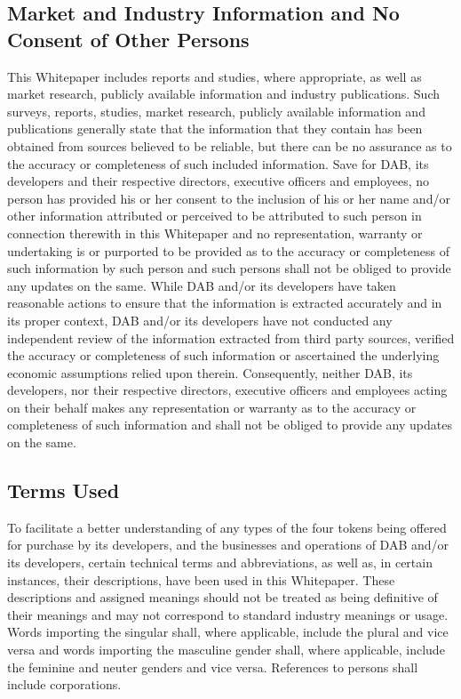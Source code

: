 \documentclass[review]{elsarticle}
\begin{document}
\subsection{Market and Industry Information and No Consent of Other Persons}
This Whitepaper includes reports and studies, where appropriate, as well as market research, publicly available information and industry publications. Such surveys, reports, studies, market research, publicly available information and publications generally state that the information that they contain has been obtained from sources believed to be reliable, but there can be no assurance as to the accuracy or completeness of such included information. 
Save for DAB, its developers and their respective directors, executive officers and employees, no person has provided his or her consent to the inclusion of his or her name and/or other information attributed or perceived to be attributed to such person in connection therewith in this Whitepaper and no representation, warranty or undertaking is or purported to be provided as to the accuracy or completeness of such information by such person and such persons shall not be obliged to provide any updates on the same. 
While DAB and/or its developers have taken reasonable actions to ensure that the information is extracted accurately and in its proper context, DAB and/or its developers have not conducted any independent review of the information extracted from third party sources, verified the accuracy or completeness of such information or ascertained the underlying economic assumptions relied upon therein. Consequently, neither DAB, its developers, nor their respective directors, executive officers and employees acting on their behalf makes any representation or warranty as to the accuracy or completeness of such information and shall not be obliged to provide any updates on the same. 

\subsection{Terms Used}
To facilitate a better understanding of any types of the four tokens being offered for purchase by its developers, and the businesses and operations of DAB and/or its developers, certain technical terms and abbreviations, as well as, in certain instances, their descriptions, have been used in this Whitepaper. These descriptions and assigned meanings should not be treated as being definitive of their meanings and may not correspond to standard industry meanings or usage. 
Words importing the singular shall, where applicable, include the plural and vice versa and words importing the masculine gender shall, where applicable, include the feminine and neuter genders and vice versa. References to persons shall include corporations. 
\end{document}
